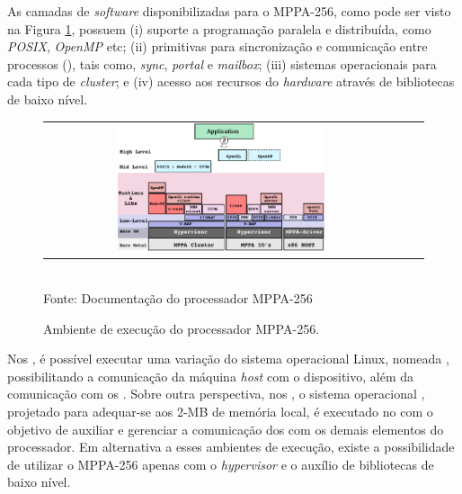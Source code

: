 \documentclass[
	12pt,				%
	openright,			%
	twoside,			%
	a4paper,			%
	english,			%
	brazil,				%
	]{abntex2}
\begin{document}
        As camadas de \textit{software} disponibilizadas para o  MPPA-256,
        como pode ser visto na Figura \ref{figruntime}, possuem
        (i) suporte a programação paralela e distribuída, como
        \textit{POSIX}, \textit{OpenMP} etc;
        (ii) primitivas para sincronização e comunicação entre processos
        (\ipc), tais como, \textit{sync}, \textit{portal} e \textit{mailbox};
        (iii) sistemas operacionais para cada tipo de \textit{cluster}; e
        (iv) acesso aos recursos do \textit{hardware} através de bibliotecas de baixo nível.

        \begin{figure}[b]
        	\begin{center}
            	\caption{Ambiente de execução do processador MPPA-256.}
                   \label{figruntime}
        		\begin{tabular}{ccc}
        			\includegraphics[width=0.6\textwidth]{figs/software_stack.png} \\
        		\end{tabular}
                \vspace{1ex} \\
                Fonte: Documentação do processador MPPA-256
            \end{center}
           \vspace{-2ex}
        \end{figure}

        Nos \ioclusters, é possível executar uma variação do sistema
        operacional Linux, nomeada \rtems, possibilitando a comunicação da
        máquina \textit{host} com o dispositivo, além da comunicação
        com os \cpclusters.
        Sobre outra perspectiva, nos \cpclusters, o sistema operacional
        \nodeos, projetado para adequar-se aos 2-MB de memória local, é executado 
        no \rman com o objetivo de auxiliar e gerenciar a comunicação dos \pes
        com os demais elementos do processador.
        Em alternativa a esses ambientes de execução, existe a possibilidade
        de utilizar o MPPA-256 apenas com o \textit{hypervisor} 
        e o auxílio de bibliotecas de baixo nível.
        
\end{document}
